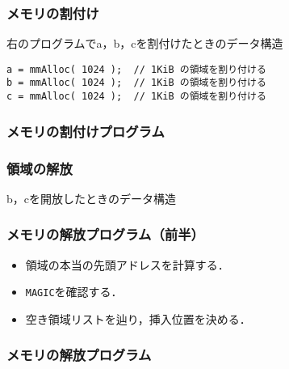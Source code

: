 \documentclass{beamer}                   %
\begin{document}
\begin{frame}[fragile]
  \frametitle{メモリの割付け}
  右のプログラムでa，b，cを割付けたときのデータ構造
  \begin{center}
    \begin{minipage}{0.39\columnwidth}
    \end{minipage}
    \begin{minipage}{0.59\columnwidth}
      \begin{lstlisting}
a = mmAlloc( 1024 );  // 1KiB の領域を割り付ける
b = mmAlloc( 1024 );  // 1KiB の領域を割り付ける
c = mmAlloc( 1024 );  // 1KiB の領域を割り付ける
      \end{lstlisting}
    \end{minipage}
  \end{center}
\end{frame}

\begin{frame}
  \frametitle{メモリの割付けプログラム}
\end{frame}

\begin{frame}
  \frametitle{領域の解放}
  b，cを開放したときのデータ構造\\\vfill
  \begin{minipage}{0.49\columnwidth}
  \end{minipage}
  \begin{minipage}{0.49\columnwidth}
  \end{minipage}
\end{frame}

\begin{frame}
  \frametitle{メモリの解放プログラム（前半）}
  \begin{itemize}
  \item 領域の本当の先頭アドレスを計算する．
  \item {\tt MAGIC}を確認する．
  \item 空き領域リストを辿り，挿入位置を決める．
  \end{itemize}
\end{frame}

\begin{frame}
  \frametitle{メモリの解放プログラム}
\end{frame}
\end{document}
